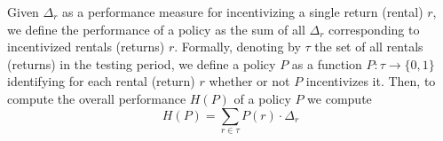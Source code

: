 Given $\Delta_r$ as a performance measure for incentivizing a single return (rental) $r$, we define the performance of a policy as the sum of all $\Delta_r$ corresponding to incentivized rentals (returns) $r$. Formally, denoting by $\tau$ the set of all rentals (returns) in the testing period, we define a policy $P$ as a function $P:\tau\to \{0,1\}$ identifying for each rental (return) $r$ whether or not $P$ incentivizes it. Then,   %
to compute the overall performance $H(P)$ of a policy $P$ we compute
\begin{equation}
 H (P) =  \sum_{r \in \tau} P(r) \cdot \Delta_r 
\end{equation}



